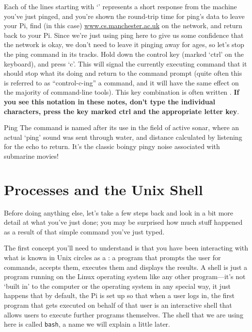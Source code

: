 
Each of the lines starting with `' represents a short response from the machine you've just pinged, and you're shown the round-trip time for ping's data to leave your Pi, find (in this case) \url{www.cs.manchester.ac.uk} on the network, and return back to your Pi. Since we're just using ping here to give us some confidence that the network is okay, we don't need to leave it pinging away for ages, so let's stop the ping command in its tracks. Hold down the control key (marked `ctrl' on the keyboard), and press `c'. This will signal the currently executing command that it should stop what its doing and return to the command prompt (quite often this is referred to as ``control-c-ing'' a command, and it will have the same effect on the majority of command-line tools). This key combination is often written . \textbf{If you see this notation in these notes, don't type the individual characters, press the key marked ctrl and the appropriate letter key}.

\begin{diversion}{Ping}
  The  command is named after its use in the field of active sonar, where an actual `ping' sound was sent through water, and distance calculated by listening for the echo to return. It's the classic boingy pingy noise associated with submarine movies!
\end{diversion}

\section{Processes and the Unix Shell}

Before doing anything else, let's take a few steps back and look in a bit more detail at what you've just done; you may be surprised how much stuff happened as a result of that simple command you've just typed.

The first concept you'll need to understand is that you have been
interacting with what is known in Unix circles as a : a program that prompts
the user for commands, accepts them, executes them and displays the
results. A shell is just a program running on the Linux operating system like any other program---it's not `built in' to the computer or the operating system in any special way, it just happens that by default, the Pi is set up so that when a user logs in, the first program that gets executed on behalf of that user is an interactive shell that allows users to execute further programs themselves. The shell that we are using here is called \texttt{bash}, a name we will explain a little later.

